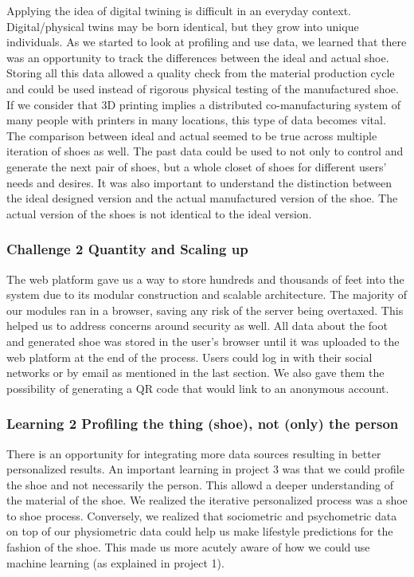Applying the idea of digital twining is difficult in an everyday context. Digital/physical twins may be born identical, but they grow into unique individuals. As we started to look at profiling and use data, we learned that there was an opportunity to track the differences between the ideal and actual shoe. Storing all this data allowed a quality check from the material production cycle and could be used instead of rigorous physical testing of the manufactured shoe. If we consider that 3D printing implies a distributed co-manufacturing \cite{Nachtigall2019} system of many people with printers in many locations, this type of data becomes vital. The comparison between ideal and actual seemed to be true across multiple iteration of shoes as well. The past data could be used to not only to control and generate the next pair of shoes, but a whole closet of shoes for different users' needs and desires. It was also important to understand the distinction between the ideal designed version and the actual manufactured version of the shoe. The actual version of the shoes is not identical to the ideal version.  

\subsubsection{Challenge 2 Quantity and Scaling up}

The web platform gave us a way to store hundreds and thousands of feet into the system due to its modular construction and scalable architecture. The majority of our modules ran in a browser, saving any risk of the server being overtaxed. This helped us to address concerns around security as well. All data about the foot and generated shoe was stored in the user's browser until it was uploaded to the web platform at the end of the process. Users could log in with their social networks or by email as mentioned in the last section. We also gave them the possibility of generating a QR code that would link to an anonymous account.

\subsubsection{Learning 2 Profiling the thing (shoe), not (only) the person}

There is an opportunity for integrating more data sources resulting in better personalized results. An important learning in project 3 was that we could profile the shoe and not necessarily the person. This allowd a deeper understanding of the material of the shoe. We realized the iterative personalized process was a shoe to shoe process. Conversely, we realized that sociometric and psychometric data on top of our physiometric data could help us make lifestyle predictions for the fashion of the shoe. This made us more acutely aware of how we could use machine learning (as explained in project 1). 

